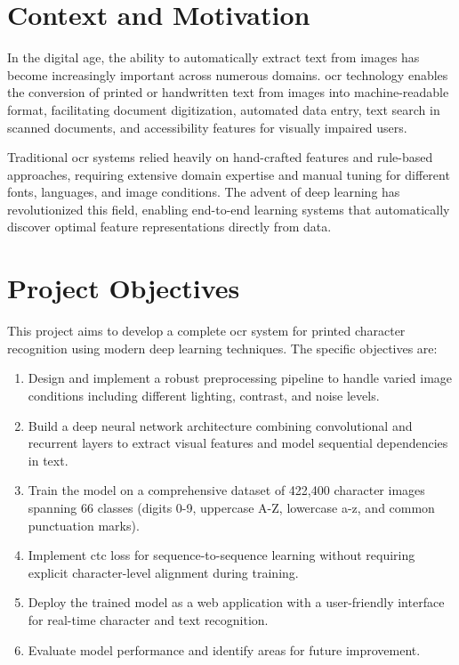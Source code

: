 \section*{Context and Motivation}

In the digital age, the ability to automatically extract text from images has become
increasingly important across numerous domains. \gls{ocr} technology enables the conversion
of printed or handwritten text from images into machine-readable format, facilitating
document digitization, automated data entry, text search in scanned documents, and
accessibility features for visually impaired users.

Traditional \gls{ocr} systems relied heavily on hand-crafted features and rule-based
approaches, requiring extensive domain expertise and manual tuning for different fonts,
languages, and image conditions. The advent of deep learning has revolutionized this
field, enabling end-to-end learning systems that automatically discover optimal feature
representations directly from data.

\section*{Project Objectives}

This project aims to develop a complete \gls{ocr} system for printed character recognition
using modern deep learning techniques. The specific objectives are:

\begin{enumerate}
\item Design and implement a robust preprocessing pipeline to handle varied image
conditions including different lighting, contrast, and noise levels.

\item Build a deep neural network architecture combining convolutional and recurrent
layers to extract visual features and model sequential dependencies in text.

\item Train the model on a comprehensive dataset of 422,400 character images spanning
66 classes (digits 0-9, uppercase A-Z, lowercase a-z, and common punctuation marks).

\item Implement \gls{ctc} loss for sequence-to-sequence learning without requiring
explicit character-level alignment during training.

\item Deploy the trained model as a web application with a user-friendly interface
for real-time character and text recognition.

\item Evaluate model performance and identify areas for future improvement.
\end{enumerate}

